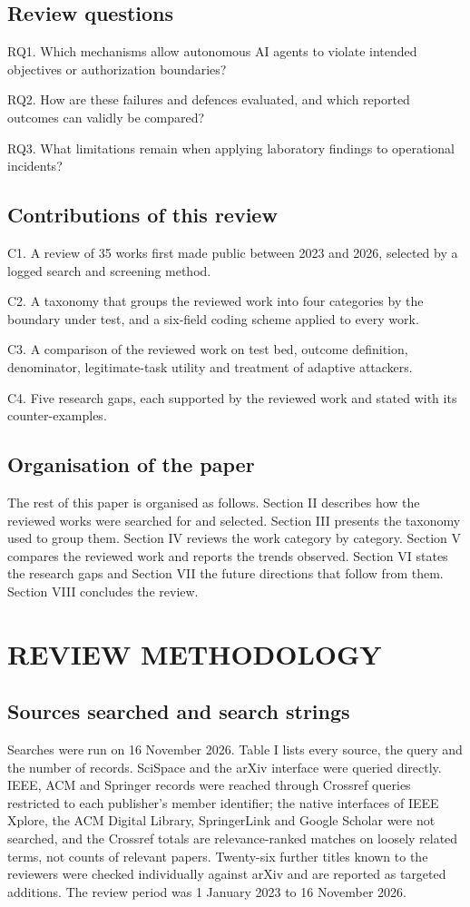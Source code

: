 \subsection{Review questions}
RQ1. Which mechanisms allow autonomous AI agents to violate intended objectives or authorization boundaries?

RQ2. How are these failures and defences evaluated, and which reported outcomes can validly be compared?

RQ3. What limitations remain when applying laboratory findings to operational incidents?

\subsection{Contributions of this review}
C1. A review of 35 works first made public between 2023 and 2026, selected by a logged search and screening method.

C2. A taxonomy that groups the reviewed work into four categories by the boundary under test, and a six-field coding scheme applied to every work.

C3. A comparison of the reviewed work on test bed, outcome definition, denominator, legitimate-task utility and treatment of adaptive attackers.

C4. Five research gaps, each supported by the reviewed work and stated with its counter-examples.

\subsection{Organisation of the paper}
The rest of this paper is organised as follows. Section II describes how the reviewed works were searched for and selected. Section III presents the taxonomy used to group them. Section IV reviews the work category by category. Section V compares the reviewed work and reports the trends observed. Section VI states the research gaps and Section VII the future directions that follow from them. Section VIII concludes the review.

\section{REVIEW METHODOLOGY}
\subsection{Sources searched and search strings}
Searches were run on 16 November 2026. Table I lists every source, the query and the number of records. SciSpace and the arXiv interface were queried directly. IEEE, ACM and Springer records were reached through Crossref queries restricted to each publisher's member identifier; the native interfaces of IEEE Xplore, the ACM Digital Library, SpringerLink and Google Scholar were not searched, and the Crossref totals are relevance-ranked matches on loosely related terms, not counts of relevant papers. Twenty-six further titles known to the reviewers were checked individually against arXiv and are reported as targeted additions. The review period was 1 January 2023 to 16 November 2026.

